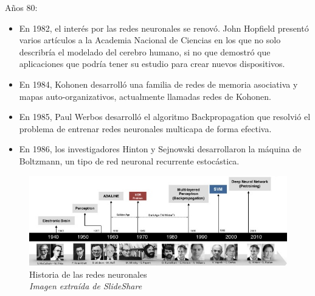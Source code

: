 Años 80:
\begin{itemize}
\item En 1982, el interés por las redes neuronales se renovó. John Hopfield presentó varios artículos a la Academia Nacional de Ciencias en los que no solo describría el modelado del cerebro humano, si no que demostró que aplicaciones que podría tener su estudio para crear nuevos dispositivos.
\item En 1984, Kohonen desarrolló una familia de redes de memoria asociativa y mapas auto-organizativos, actualmente llamadas redes de Kohonen.
\item En 1985, Paul Werbos desarrolló el algoritmo Backpropagation que resolvió el problema de entrenar redes neuronales multicapa de forma efectiva.
\item En 1986, los investigadores Hinton y Sejnowski desarrollaron la máquina de Boltzmann, un tipo de red neuronal recurrente estocástica.
\end{itemize}

\begin{figure}[htp]
\centering
\includegraphics[scale=0.60]{images/history.jpg}
\caption{Historia de las redes neuronales\\\textit{Imagen extraída de SlideShare}}
\end{figure}

